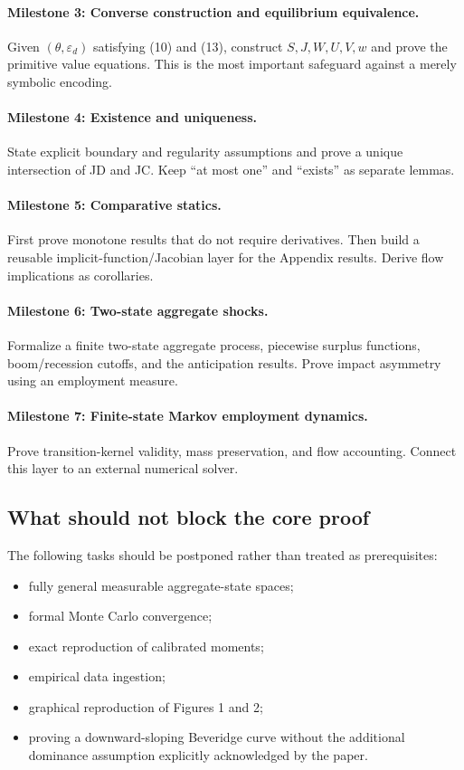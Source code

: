 \documentclass[11pt]{article}
\newcommand{\epsd}{\varepsilon_d}
\begin{document}
\paragraph{Milestone 3: Converse construction and equilibrium equivalence.}
Given $(\theta,\epsd)$ satisfying (10) and (13), construct $S,J,W,U,V,w$ and prove the primitive value equations. This is the most important safeguard against a merely symbolic encoding.

\paragraph{Milestone 4: Existence and uniqueness.}
State explicit boundary and regularity assumptions and prove a unique intersection of JD and JC. Keep ``at most one'' and ``exists'' as separate lemmas.

\paragraph{Milestone 5: Comparative statics.}
First prove monotone results that do not require derivatives. Then build a reusable implicit-function/Jacobian layer for the Appendix results. Derive flow implications as corollaries.

\paragraph{Milestone 6: Two-state aggregate shocks.}
Formalize a finite two-state aggregate process, piecewise surplus functions, boom/recession cutoffs, and the anticipation results. Prove impact asymmetry using an employment measure.

\paragraph{Milestone 7: Finite-state Markov employment dynamics.}
Prove transition-kernel validity, mass preservation, and flow accounting. Connect this layer to an external numerical solver.

\subsection{What should not block the core proof}
The following tasks should be postponed rather than treated as prerequisites:

\begin{itemize}
\item fully general measurable aggregate-state spaces;
\item formal Monte Carlo convergence;
\item exact reproduction of calibrated moments;
\item empirical data ingestion;
\item graphical reproduction of Figures 1 and 2;
\item proving a downward-sloping Beveridge curve without the additional dominance assumption explicitly acknowledged by the paper.
\end{itemize}
\end{document}
